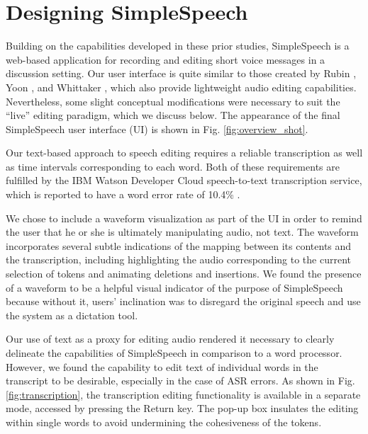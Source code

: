 \section{Designing SimpleSpeech}
Building on the capabilities developed in these prior studies, SimpleSpeech is a web-based application for recording and editing short voice messages in a discussion setting.
Our user interface is quite similar to those created by Rubin \cite{rubin}, Yoon \cite{yoon}, and Whittaker \cite{whittaker_semantic}, which also provide lightweight audio editing capabilities.
Nevertheless, some slight conceptual modifications were necessary to suit the ``live'' editing paradigm, which we discuss below.
The appearance of the final SimpleSpeech user interface (UI) is shown in Fig. \ref{fig:overview_shot}.

Our text-based approach to speech editing requires a reliable transcription as well as time intervals corresponding to each word.
Both of these requirements are fulfilled by the IBM Watson Developer Cloud speech-to-text transcription service, which is reported to have a word error rate of 10.4\% \cite{soltau:2014}.

We chose to include a waveform visualization as part of the UI in order to remind the user that he or she is ultimately manipulating audio, not text. 
The waveform incorporates several subtle indications of the mapping between its contents and the transcription, including highlighting the audio corresponding to the current selection of tokens and animating deletions and insertions.
We found the presence of a waveform to be a helpful visual indicator of the purpose of SimpleSpeech because without it, users' inclination was to disregard the original speech and use the system as a dictation tool.

Our use of text as a proxy for editing audio rendered it necessary to clearly delineate the capabilities of SimpleSpeech in comparison to a word processor.
However, we found the capability to edit text of individual words in the transcript to be desirable, especially in the case of ASR errors.
As shown in Fig. \ref{fig:transcription}, the transcription editing functionality is available in a separate mode, accessed by pressing the Return key.
The pop-up box insulates the editing within single words to avoid undermining the cohesiveness of the tokens. 

